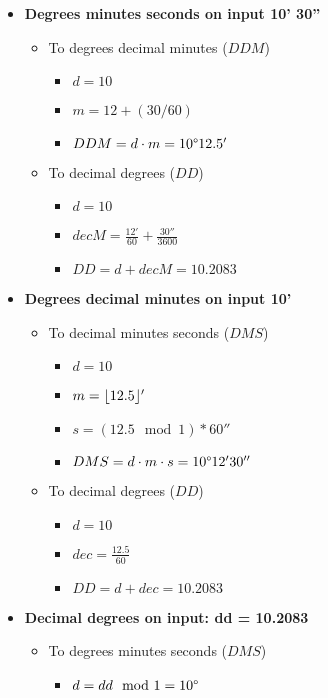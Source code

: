 \begin{itemize}
	\item \textbf{Degrees minutes seconds on input 10' 30''}
	\begin{itemize}
		\item To degrees decimal minutes ($DDM$)
		\begin{itemize}
			\item $ d = 10$
			\item $ m = 12 + (30/60)$
			\item $DDM = d \cdot m = 10\degree 12.5' $
		\end{itemize}
		\item To decimal degrees ($DD$)
		\begin{itemize}
			\item $ d = 10 $
			\item $ decM = \frac{12'}{60} + \frac{30''}{3600}$
			\item $ DD = d + decM = 10.2083 $
		\end{itemize}
	\end{itemize}
	\item \textbf{Degrees decimal minutes on input 10'}
	\begin{itemize}
		\item To decimal minutes seconds ($DMS$)
		\begin{itemize}
			\item $ d = 10 $
			\item $ m = \lfloor12.5\rfloor'$
			\item $ s = (12.5 \mod 1) * 60''$
			\item $ DMS = d \cdot m \cdot s = 10\degree 12' 30''$
		\end{itemize}
		\item To decimal degrees ($DD$)
		\begin{itemize}
			\item $ d = 10 $
			\item $ dec = \frac{12.5}{60}$
			\item $ DD = d + dec = 10.2083$
		\end{itemize}
	\end{itemize}
	\item \textbf{Decimal degrees on input: dd = 10.2083\degree}
	\begin{itemize}
		\item To degrees minutes seconds ($DMS$)
		\begin{itemize}
			\item $ d = dd \mod 1 = 10\degree $

\end{itemize}
\end{itemize}
\end{itemize}

